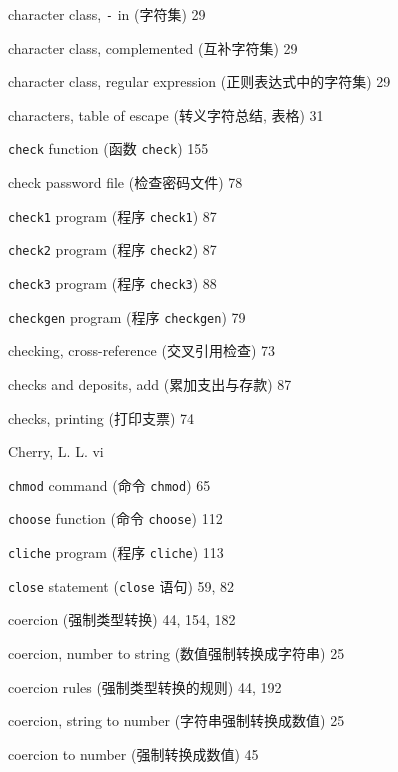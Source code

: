 \begin{multicols}{2}
\hangindent=2pc  character class, \verb'-' in (字符集) 29

\hangindent=2pc  character class, complemented (互补字符集) 29

\hangindent=2pc  character class, regular expression
(正则表达式中的字符集) 29

\hangindent=2pc  characters, table of escape (转义字符总结,
表格) 31

\hangindent=2pc  \verb'check' function (函数 \verb'check') 155

\hangindent=2pc  check password file (检查密码文件) 78

\hangindent=2pc  \verb'check1' program (程序 \verb'check1') 87

\hangindent=2pc  \verb'check2' program (程序 \verb'check2') 87

\hangindent=2pc  \verb'check3' program (程序 \verb'check3') 88

\hangindent=2pc  \verb'checkgen' program (程序 \verb'checkgen') 79

\hangindent=2pc  checking, cross-reference (交叉引用检查) 73

\hangindent=2pc  checks and deposits, add (累加支出与存款) 87

\hangindent=2pc  checks, printing (打印支票) 74

\hangindent=2pc  Cherry, L. L. vi

\hangindent=2pc  \verb'chmod' command (命令 \verb'chmod') 65

\hangindent=2pc  \verb'choose' function (命令 \verb'choose') 112

\hangindent=2pc  \verb'cliche' program (程序 \verb'cliche') 113

\hangindent=2pc  \verb'close' statement (\verb'close' 语句) 59, 82

\hangindent=2pc  coercion (强制类型转换) 44, 154, 182

\hangindent=2pc  coercion, number to string
(数值强制转换成字符串) 25

\hangindent=2pc  coercion rules (强制类型转换的规则) 44, 192

\hangindent=2pc  coercion, string to number
(字符串强制转换成数值) 25

\hangindent=2pc  coercion to number (强制转换成数值) 45


\end{multicols}
